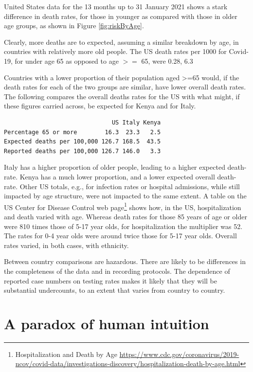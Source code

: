 \documentclass[
  10pt,
  b5paper]{book}
\begin{document}
United States data for the 13 months up to 31 January 2021 shows
a stark difference in death rates, for those in younger as
compared with those in older age groups, as shown in Figure
\ref{fig:riskByAge}.

Clearly, more deaths are to expected, assuming a similar
breakdown by age, in countries with relatively more old people. The US
death rates per 1000 for Covid-19, for under age 65 as opposed to age \(>=\) 65, were 0.28, 6.3

Countries with a lower proportion of their population aged \textgreater=65
would, if the death rates for each of the two groups are similar,
have lower overall death rates. The following compares the
overall deaths rates for the US with what might, if these figures
carried across, be expected for Kenya and for Italy.

\begin{verbatim}
                               US Italy Kenya
Percentage 65 or more        16.3  23.3   2.5
Expected deaths per 100,000 126.7 168.5  43.5
Reported deaths per 100,000 126.7 146.0   3.3
\end{verbatim}

Italy has a higher proportion of older people, leading to a higher
expected death-rate. Kenya has a much lower proportion, and a lower
expected overall death-rate. Other US totals, e.g., for infection rates
or hospital admissions, while still impacted by age structure, were not
impacted to the same extent. A table on the US Center for Disease
Control web page\footnote{Hospitalization and Death by Age \url{https://www.cdc.gov/coronavirus/2019-ncov/covid-data/investigations-discovery/hospitalization-death-by-age.html}}
shows how, in the US, hospitalization and death varied with
age. Whereas death rates for those 85 years of age or older were
810 times those of 5-17 year olds, for hospitalization the multiplier
was 52. The rates for 0-4 year olds were around twice those for
5-17 year olds. Overall rates varied, in both cases, with ethnicity.

Between country comparisons are hazardous. There are likely to be
differences in the completeness of the data and in recording protocols.
The dependence of reported case numbers on testing rates makes it
likely that they will be substantial undercounts, to an extent that
varies from country to country.

\hypertarget{a-paradox-of-human-intuition}{%
\section{A paradox of human intuition}\label{a-paradox-of-human-intuition}}
\end{document}
